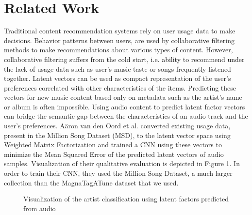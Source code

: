 \documentclass[11pt, a4paper]{article}
\begin{document}
  \section{Related Work}
    Traditional content recommendation systems rely on user usage data to make
    decisions. Behavior patterns between users, are used by collaborative
    filtering methods to make recommendations about various types of content.
    However, collaborative filtering suffers from the cold start, i.e. ability
    to recommend under the lack of usage data such as user's music taste or
    songs frequently listened together.
    \noindent
    Latent vectors can be used as compact representation of the user's
    preferences correlated with other characteristics of the items. Predicting
    these vectors for new music content based only on metadata such as the artist's
    name or album is often impossible. Using audio content to predict latent factor
    vectors can bridge the semantic gap between the characteristics of an audio
    track and the user's preferences. A\"{a}ron van den Oord et al.
    \cite{deep-content-based-music-recommendation} converted existing usage
    data, present in the Million Song Dataset (MSD), to the latent vector space
    using Weighted Matrix Factorization and trained a CNN using these vectors
    to minimize the Mean Squared Error of the predicted latent vectors of audio
    samples. Visualization of their qualitative evaluation is depicted in
    Figure 1. In order to train their CNN, they used the Million Song Dataset,
    a much larger collection than the MagnaTagATune dataset that we used.

    \begin{figure}
      \centering
      \caption{Visualization of the artist classification using latent factors
        predicted from audio \cite{deep-content-based-music-recommendation}}
    \end{figure}
\end{document}
